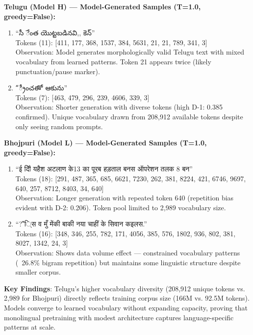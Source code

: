 \documentclass[11pt,a4paper]{article}
\begin{document}
\textbf{Telugu (Model H) — Model-Generated Samples (T=1.0, greedy=False):}

\begin{enumerate}
    \item ``సీ ేంత యొట్టబడినవి,, కెన్''
    \\Tokens (11): [411, 177, 368, 1537, 384, 5631, 21, 21, 789, 341, 3]
    \\Observation: Model generates morphologically valid Telugu text with mixed vocabulary from learned patterns. Token 21 appears twice (likely punctuation/pause marker).

    \item ``్రీంచఈో ఆకును''
    \\Tokens (7): [463, 479, 296, 239, 4606, 339, 3]
    \\Observation: Shorter generation with diverse tokens (high D-1: 0.385 confirmed). Unique vocabulary drawn from 208,912 available tokens despite only seeing random prompts.
\end{enumerate}

\textbf{Bhojpuri (Model L) — Model-Generated Samples (T=1.0, greedy=False):}

\begin{enumerate}
    \item ``ई दिॏ यहैश अटलाण के13 का पूरब हड़ताल बनस ऑपरेशन तलक 8 बन''
    \\Tokens (18): [291, 487, 365, 685, 6621, 7230, 262, 381, 8224, 421, 6746, 9697, 640, 257, 8712, 8403, 34, 640]
    \\Observation: Longer generation with repeated token 640 (repetition bias evident with D-2: 0.206). Token pool limited to 2,989 vocabulary size.

    \item ``?"ि्स व मुँ मेंकी बाकी नया चाहीं के सिवान कइलस.''
    \\Tokens (16): [348, 346, 255, 782, 171, 4056, 385, 576, 1802, 936, 802, 381, 8027, 1342, 24, 3]
    \\Observation: Shows data volume effect — constrained vocabulary patterns (~26.8\% bigram repetition) but maintains some linguistic structure despite smaller corpus.
\end{enumerate}

\textbf{Key Findings}: Telugu's higher vocabulary diversity (208,912 unique tokens vs. 2,989 for Bhojpuri) directly reflects training corpus size (166M vs. 92.5M tokens). Models converge to learned vocabulary without expanding capacity, proving that monolingual pretraining with modest architecture captures language-specific patterns at scale.
\end{document}

